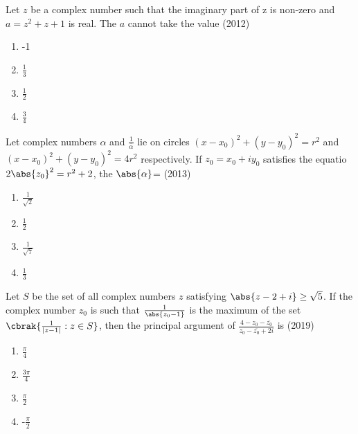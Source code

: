 \item Let $z$ be a complex number such that the imaginary part of z is non-zero and $a=z^{2}+z+1$ is real. The $a$ cannot take the value \hfill{(2012)}
	\begin{multicols}{4}
\begin{enumerate}
	\item -1
	\item $\frac{1}{3}$
	\item $\frac{1}{2}$
	\item $\frac{3}{4}$
\end{enumerate}
	\end{multicols}

\item Let complex numbers $\alpha$ and $\frac{1}{\overline{\alpha}}$ lie on circles $(x-x_{0})^{2}+(y-y_{0})^{2}=r^{2}$ and $(x-x_{0})^{2}+(y-y_{0})^{2}=4r^{2}$ respectively. If $z_{0}=x_{0}+iy_{0}$ satisfies the equatio  $2\abs{z_{0}} ^{2}=r^{2}+2$, the $\abs{\alpha}$= \hfill{(2013)}
	\begin{multicols}{4}
\begin{enumerate}
	\item $\frac{1}{\sqrt{2}}$
	\item $\frac{1}{2}$
	\item $\frac{1}{\sqrt{7}}$
	\item $\frac{1}{3}$
\end{enumerate}
	\end{multicols}

\item Let $S$ be the set of all complex numbers $z$ satisfying $\abs{z-2+i}\geq\sqrt{5}$. If the complex number $z_{0}$ is such that $\frac{1}{\abs{z_{0}-1}}$ is the maximum of the set  $\cbrak{\frac{1}{|z-1|} : z \in S}$, then the principal argument of $\frac{4-z_{0}-\overline{z_{0}}}{z_{0}-\overline{z_{0}}+2i}$ is  \hfill{(2019)}
	\begin{multicols}{4}
\begin{enumerate}
	\item $\frac{\pi}{4}$
	\item $\frac{3\pi}{4}$
	\item $\frac{\pi}{2}$
	\item -$\frac{\pi}{2}$
\end{enumerate}
	\end{multicols}

